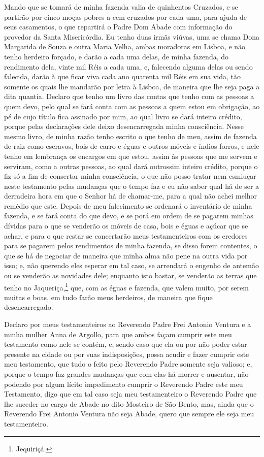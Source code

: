 Mando que se tomará de minha fazenda valia de quinhentos Cruzados, e se
partirão por cinco moças pobres a cem cruzados por cada uma, para ajuda
de seus casamentos, o que repartirá o Padre Dom Abade com informação do
provedor da Santa Misericórdia. Eu tenho duas irmãs viúvas, uma se
chama Dona Margarida de Souza e outra Maria Velha, ambas moradoras em 
Lisboa, e não tenho herdeiro forçado, e darão a cada uma delas, de
minha fazenda, do rendimento dela, vinte mil Réis a cada uma, e,
falecendo alguma delas ou sendo falecida, darão à que ficar viva cada
ano quarenta mil Réis em sua vida, tão somente os quais lhe mandarão
por letra à Lisboa, de maneira que lhe seja paga a dita quantia.
Declaro que tenho um livro das contas que tenho com as pessoas a quem
devo, pelo qual se fará conta com as pessoas a quem estou em obrigação,
ao pé de cujo título fica assinado por mim, ao qual livro se dará
inteiro crédito, porque pelas declarações dele deixo desencarregada
minha consciência. Nesse mesmo livro, de minha razão tenho escrito o
que tenho de meu, assim de fazenda de raiz como escravos, bois de carro
e éguas e outros móveis e índios forros, e nele tenho em lembrança os
encargos em que estou, assim às pessoas que me servem e serviram, como
a outras pessoas, ao qual dará outrossim inteiro crédito, porque o fiz
só a fim de consertar minha consciência, o que não posso tratar nem
esmiuçar neste testamento pelas mudanças que o tempo faz e eu não saber
qual há de ser a derradeira hora em que o Senhor há de chamar-me, para
a qual não achei melhor remédio que este. Depois de meu falecimento se
ordenará o inventário de minha fazenda, e se fará conta do que devo, e
se porá em ordem de se pagarem minhas dívidas para o que se venderão os
móveis de casa, bois e éguas e açúcar que se achar, e para o que restar
se concertarão meus testamenteiros com os credores para se pagarem
pelos rendimentos de minha fazenda, se disso forem contentes, o que se
há de negociar de maneira que minha alma não pene na outra vida por
isso; e, não querendo eles esperar em tal caso, se arrendará o engenho
de antemão ou se venderão as novidades dele; enquanto isto bastar, se
venderão as terras que tenho no Jaqueriça,\footnote{ Jequiriçá.} que,
com as éguas e fazenda, que valem muito, por serem muitas e boas, em
tudo farão meus herdeiros, de maneira que fique desencarregado.

Declaro por meus testamenteiros ao Reverendo Padre Frei Antonio Ventura
e a minha mulher Anna de Argollo, para que ambos façam cumprir este meu
testamento como nele se contém, e, sendo caso que ela ou por não poder
estar presente na cidade ou por suas indisposições, possa acudir e
fazer cumprir este meu testamento, que tudo o feito pelo Reverendo
Padre somente seja valioso; e, porque o tempo faz grandes mudanças que
com elas há morrer e ausentar, não podendo por algum lícito impedimento
cumprir o Reverendo Padre este meu Testamento, digo que em tal caso
seja meu testamenteiro o Reverendo Padre que lhe suceder no cargo de
Abade no dito Mosteiro de São Bento, mas, ainda que o Reverendo Frei
Antonio Ventura não seja Abade, quero que sempre ele seja meu
testamenteiro.

